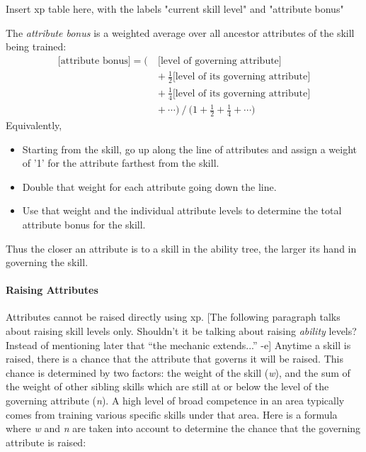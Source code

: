 \documentclass[12pt]{article}
\newcommand{\notes}[1]{{\color{Tan} #1}}
\begin{document}
\notes{Insert xp table here, with the labels "current skill level" and "attribute bonus"}

The \emph{attribute bonus} is a weighted average over all ancestor attributes of the skill being trained:
\begin{align*}
\textrm{[attribute bonus]}
=\big(\ &\textrm{[level of governing attribute]}\\
&+\ \frac{1}{2}\textrm{[level of its governing attribute]}\\
&+\ \frac{1}{4}\textrm{[level of its governing attribute]}\\
&+\ \cdots \big)
\ /\ \big(1+\frac{1}{2}+\frac{1}{4}+\cdots\big)
\end{align*}
Equivalently,
\vspace{-6mm}
\begin{itemize}
\item Starting from the skill, go up along the line of attributes
and assign a weight of '1' for the attribute farthest from the skill.
\item Double that weight for each attribute going down the line.
\item Use that weight and the individual attribute levels to determine the total attribute bonus for the skill.
\end{itemize}
\vspace{-6mm}
Thus the closer an attribute is to a skill in the ability tree, the larger its hand in governing the skill. 




\paragraph{Raising Attributes}
Attributes cannot be raised directly using xp.
\notes{[The following paragraph talks about raising skill levels only.
Shouldn't it be talking about raising \emph{ability} levels?
Instead of mentioning later that ``the mechanic extends...'' -e]}
Anytime a skill is raised, there is a chance that the attribute that governs it will be raised.
This chance is determined by two factors: the weight of the skill (\emph{w}), and the sum of the weight of other sibling skills which are still at or below the level of the governing attribute (\emph{n}).
A high level of broad competence in an area typically comes from training various specific skills under that area.
Here is a formula where \emph{w} and \emph{n} are taken into account to determine the chance that the governing attribute is raised:
\end{document}
